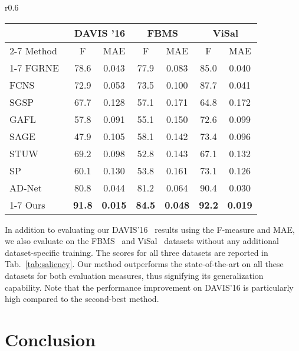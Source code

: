 \documentclass{bmvc2k_arxiv}
\begin{document}
\begin{wraptable}{r}{0.6\textwidth}
\vspace{-5mm}
\footnotesize
\setlength{\tabcolsep}{4pt} \centering
{}
\begin{tabular}{l|cc |cc|cc}
\toprule
 &\multicolumn{2}{c|}{DAVIS '16} & \multicolumn{2}{c|}{FBMS} & \multicolumn{2}{c}{ViSal} \\
 \cmidrule(lr){2-7}
 Method & F & MAE & F & MAE & F & MAE \\
\cmidrule(lr){1-7}
FGRNE~\cite{Li18CVPR} & 78.6 & 0.043 & 77.9 & 0.083& 85.0 & 0.040\\ 
FCNS~\cite{Wang17TIP} & 72.9 & 0.053& 73.5& 0.100& 87.7& 0.041 \\
SGSP~\cite{Liu16TCSVT} & 67.7& 0.128& 57.1&  0.171& 64.8&  0.172 \\
GAFL~\cite{Wang15TIP} & 57.8 & 0.091& 55.1&  0.150& 72.6&  0.099 \\
SAGE~\cite{Wang15CVPR} & 47.9& 0.105& 58.1&  0.142& 73.4&  0.096 \\
STUW~\cite{Fang14TIP} & 69.2& 0.098& 52.8&  0.143& 67.1& 0.132\\
SP~\cite{Liu14TCSVT}   & 60.1&0.130&53.8&0.161&73.1&0.126\\
AD-Net~\cite{Yang19ICCVAnchorDiff} & 80.8 &0.044  &81.2 & 0.064  &90.4 &0.030 \\
\cmidrule(lr){1-7}
Ours&  \textbf{91.8} &\textbf{0.015}& \textbf{84.5} & \textbf{0.048} & \textbf{92.2} & \textbf{0.019}\\
\bottomrule
\end{tabular}
\caption{\label{tab:evaltable2} F-measure and MAE for DAVIS, FBMS and ViSal datasets. : Higher is better, : Lower is better.}
\label{tab:saliency}
\vspace{-2mm}
\end{wraptable} 
In addition to evaluating our DAVIS'16~\cite{PontTuset17arxiv} results using the F-measure and MAE, we also evaluate on the FBMS~\cite{Ochs13TPAMI} and ViSal~\cite{Wang15TIP} datasets without any additional dataset-specific training. The scores for all three datasets are reported in Tab.~\ref{tab:saliency}. Our method outperforms the state-of-the-art on all these datasets for both evaluation measures, thus signifying its generalization capability. Note that the performance improvement on DAVIS'16 is particularly high compared to the second-best method.
 
\section{Conclusion}
\end{document}
